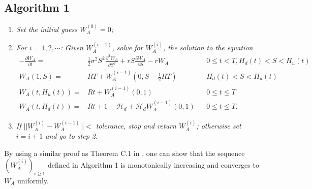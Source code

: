 \documentclass[final,pdftex]{ectaart}
\theoremstyle{plain}
\begin{document}
\begin{appendices}
\subsection*{Algorithm 1}
\begin{enumerate}
\item \textit{Set the initial guess $W_{A}^{(0)}=0$; }
\item \textit{For $i=1,2,\cdots$: Given $W_{A}^{(i-1)}$, solve for $W_{A}^{(i)}$, the solution to the equation
\begin{align*}
-\frac{\partial W_{A}}{\partial t}= & \frac{1}{2}\sigma^{2}S^{2}\frac{\partial^{2}W_{A}}{\partial S^{2}}+r S\frac{\partial W_{A}}{\partial S}-r W_{A} &  & 0\le t<T,H_{d}(t)<S<H_{u}(t)\\
W_{A}(1,S)= & RT+W_{A}^{(i-1)}(0,S-\frac{1}{2}RT) &  & H_{d}(t)<S<H_{u}(t)\\
W_{A}(t,H_{u}(t))= & Rt+W_{A}^{(i-1)}(0,1) &  & 0\le t\le T\\
W_{A}(t,H_{d}(t))= & Rt+1-\mathcal{H}_{d}+\mathcal{H}_{d}W_{A}^{(i-1)}(0,1) &  & 0\le t\le T.
\end{align*}
}
\item \textit{If $||W_{A}^{(i)}-W_{A}^{(i-1)}||<$ tolerance, stop and return $W_{A}^{(i)}$; otherwise set $i=i+1$ and go to step 2. }
\end{enumerate}
By using a similar proof as Theorem C.1 in \cite{dai_overpricing_2018}, one can show that the sequence $(W_{A}^{(i)})_{i\ge1}$ defined in Algorithm 1 is monotonically increasing and converges to $W_{A}$ uniformly.


\end{appendices}
\end{document}
